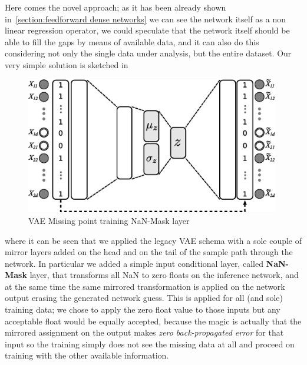 Here comes the novel approach; as it has been already shown in~\cref{section:feedforward dense networks} we can see the network itself as a non linear regression operator, we could speculate that the network itself should be able to fill the gaps by means of available data, and it can also do this considering not only the single data under analysis, but the entire dataset.
Our very simple solution is sketched in~\Figure{\ref{fig:6_vae_missing}}
%
\begin{figure}
    \centering
    \includegraphics[height=6cm]{img/6_T_Hunch/VAE_MISSING.eps}
    \caption{VAE Missing point training NaN-Mask layer}
    \label{fig:6_vae_missing}
\end{figure}
%
where it can be seen that we applied the legacy \acs{VAE} schema with a sole couple of mirror layers added on the head and on the tail of the sample path through the network. In particular we added a simple input conditional layer, called \textbf{NaN-Mask} layer, that transforms all NaN to zero floats on the inference network, and at the same time the same mirrored transformation is applied on the network output erasing the generated network guess.
This is applied for all (and sole) training data; we chose to apply the zero float value to those inputs but any acceptable float would be equally accepted, because the magic is actually that the mirrored assignment on the output makes \textit{zero back-propagated error} for that input so the training simply does not see the missing data at all and proceed on training with the other available information.
